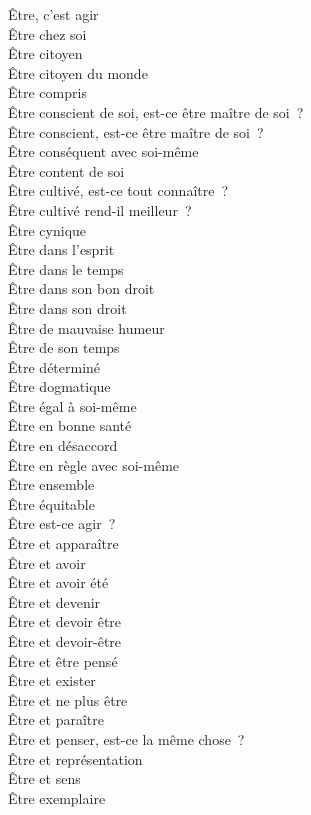 \documentclass[a4paper,12pt]{article}
\begin{document}
Être, c'est agir \\
Être chez soi \\
Être citoyen \\
Être citoyen du monde \\
Être compris \\
Être conscient de soi, est-ce être maître de soi ? \\
Être conscient, est-ce être maître de soi ? \\
Être conséquent avec soi-même \\
Être content de soi \\
Être cultivé, est-ce tout connaître ? \\
Être cultivé rend-il meilleur ? \\
Être cynique \\
Être dans l'esprit \\
Être dans le temps \\
Être dans son bon droit \\
Être dans son droit \\
Être de mauvaise humeur \\
Être de son temps \\
Être déterminé \\
Être dogmatique \\
Être égal à soi-même \\
Être en bonne santé \\
Être en désaccord \\
Être en règle avec soi-même \\
Être ensemble \\
Être équitable \\
Être est-ce agir ? \\
Être et apparaître \\
Être et avoir \\
Être et avoir été \\
Être et devenir \\
Être et devoir être \\
Être et devoir-être \\
Être et être pensé \\
Être et exister \\
Être et ne plus être \\
Être et paraître \\
Être et penser, est-ce la même chose ? \\
Être et représentation \\
Être et sens \\
Être exemplaire \\
\end{document}
